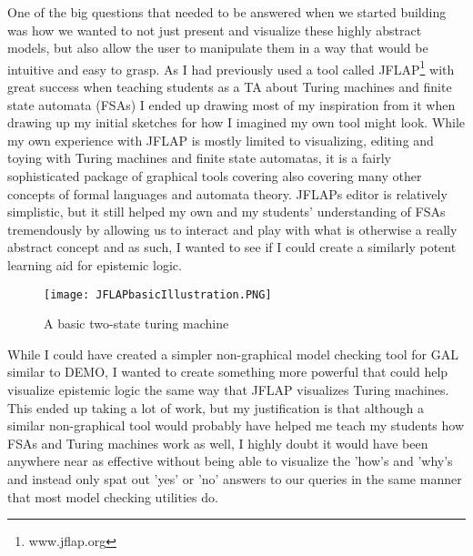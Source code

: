 One of the big questions that needed to be answered when we started building \cname{} was how we wanted to not just present and visualize these highly abstract models, but also allow the user to manipulate them in a way that would be intuitive and easy to grasp. As I had previously used a tool called JFLAP\footnote{www.jflap.org} with great success when teaching students as a TA about Turing machines and finite state automata (FSAs) I ended up drawing most of my inspiration from it when drawing up my initial sketches for how I imagined my own tool might look. While my own experience with JFLAP is mostly limited to visualizing, editing and toying with Turing machines and finite state automatas, it is a fairly sophisticated package of graphical tools covering also covering many other concepts of formal languages and automata theory. JFLAPs editor is relatively simplistic, but it still helped my own and my students' understanding of FSAs tremendously by allowing us to interact and play with what is otherwise a really abstract concept and as such, I wanted to see if I could create a similarly potent learning aid for epistemic logic. 

\begin{figure}[H]
	\label{fig:JFLAP_basic illustration}
	\caption{A basic two-state turing machine}
	\texttt{[image: JFLAPbasicIllustration.PNG]}
\end{figure}


While I could have created a simpler non-graphical model checking tool for GAL similar to DEMO, I wanted to create something more powerful that could help visualize epistemic logic the same way that JFLAP visualizes Turing machines. This ended up taking a lot of work, but my justification is that although a similar non-graphical tool would probably have helped me teach my students how FSAs and Turing machines work as well, I highly doubt it would have been anywhere near as effective without being able to visualize the 'how's and 'why's and instead only spat out 'yes' or 'no' answers to our queries in the same manner that most model checking utilities do. 

